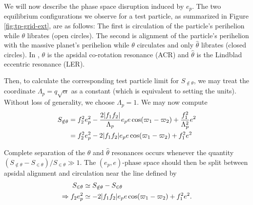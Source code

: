 \documentclass[usenatbib,twocolumn]{mnras}
\DeclarePairedDelimiter{\abs}{|}{|}
\begin{document}
We will now describe the phase
space disruption induced by \(e_p\).
The two equilibrium configurations we observe for a test particle, as
summarized in Figure \ref{fig:tp-grid-ext}, are as follows: The first is
circulation of the particle's perihelion while \(\theta\) librates (open
circles).  The second is alignment of the particle's perihelion with
the massive planet's perihelion while \(\theta\) circulates and only
\(\hat\theta\) librates (closed circles).  In
\citet{moutamid14_coupl_between_corot_lindb_reson}, \(\theta\) is the
apsidal co-rotation resonance (ACR) and \(\hat\theta\) is the Lindblad
eccentric resonance (LER).








Then, to calculate the
corresponding test particle limit for \(S_{\notin\theta}\), we may treat
the coordinate \(\Lambda_p = q\sqrt{\alpha}\) as a constant (which is
equivalent to setting the units). Without loss of generality, we
choose \(\Lambda_p=1\). We may now compute
\begin{align}
  S_{\notin\theta} &= f_2^2e_p^2 -
                     \frac{2\abs{f_1f_2}}{\Lambda_p} e_pe\cos(\varpi_1-\varpi_2) +
                     \frac{f_1^2}{\Lambda_p^2} e^2 \\
                   &=f_2^2e_p^2 -
                     2\abs{f_1f_2} e_pe\cos(\varpi_1-\varpi_2) +
                     f_1^2 e^2
\end{align}

\noindent
Complete separation of the \(\theta\) and
\(\hat\theta\) resonances occurs whenever the quantity
\((S_{\notin\theta}-S_{\in\theta})/S_{\in\theta}\gg 1\).  The
\((e_p,e)\text{-phase}\) space should then be split between apsidal
alignment and circulation near the line defined by
\begin{align}
S_{\in\theta} &\simeq S_{\notin\theta}-S_{\in\theta} \label{eq:linedef}\\
\Rightarrow f_2e_p^2 &\simeq -2\abs{f_1f_2}e_pe\cos(\varpi_1-\varpi_2) + f_1^2e^2 \label{eq:linedefcoord}.
\end{align}
\end{document}
